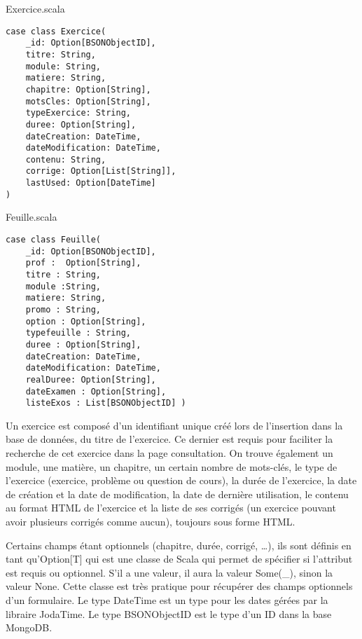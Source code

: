 \vspace{0.5cm}
\lstset{style=customScala}
\begin{minipage}[c]{8.5cm}
\begin{center}
	Exercice.scala
\end{center}
\vspace{-0.5cm}
\begin{lstlisting}
case class Exercice(
	_id: Option[BSONObjectID],
	titre: String,
	module: String,
	matiere: String,
	chapitre: Option[String],
	motsCles: Option[String],
	typeExercice: String,
	duree: Option[String],
	dateCreation: DateTime,
	dateModification: DateTime,
	contenu: String,
	corrige: Option[List[String]],
	lastUsed: Option[DateTime]
)

\end{lstlisting}
\end{minipage}
\begin{minipage}[c]{8cm}

\lstset{style=customScala, numbers=right}
\begin{center}
	Feuille.scala
\end{center}	
\vspace{-0.5cm}
\begin{lstlisting}
case class Feuille(
	_id: Option[BSONObjectID],
	prof :  Option[String],
	titre : String,
	module :String,
	matiere: String,
	promo : String,
	option : Option[String],
	typefeuille : String,
	duree : Option[String],
	dateCreation: DateTime,
	dateModification: DateTime,
	realDuree: Option[String],
	dateExamen : Option[String],
	listeExos : List[BSONObjectID] )
\end{lstlisting}
\end{minipage}

Un exercice est composé d'un identifiant unique créé lors de l'insertion dans la base de données, du titre de l'exercice. Ce dernier est requis pour faciliter la recherche de cet exercice dans la page consultation. On trouve également un module, une matière, un chapitre, un certain nombre de mots-clés, le type de l'exercice (exercice, problème ou question de cours), la durée de l'exercice, la date de création et la date de modification, la date de dernière utilisation, le contenu au format HTML de l'exercice et la liste de ses corrigés (un exercice pouvant avoir plusieurs corrigés comme aucun), toujours sous forme HTML. 

Certains champs étant optionnels (chapitre, durée, corrigé, \ldots), ils sont définis en tant qu'Option[T] qui est une classe de Scala qui permet de spécifier si l'attribut est requis ou optionnel. S'il a une valeur, il aura la valeur Some(\_), sinon la valeur None. Cette classe est très pratique pour récupérer des champs optionnels d'un formulaire. Le type DateTime est un type pour les dates gérées par la libraire JodaTime. Le type BSONObjectID est le type d'un ID dans la base MongoDB.\\ 

